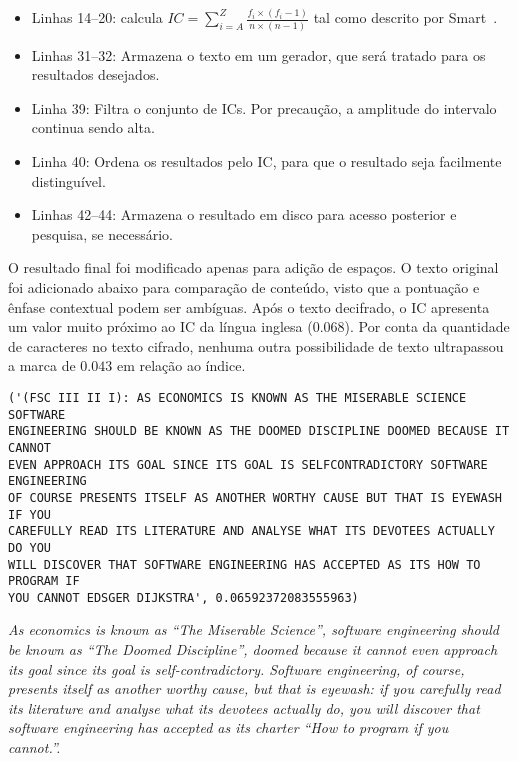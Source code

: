 \documentclass{../sftex/sftex}
\begin{document}
\begin{itemize}

    \item Linhas 14--20: calcula
        $IC = \sum_{i=A}^Z \frac{f_i \times (f_i - 1)}{n \times (n - 1)}$ tal
        como descrito por Smart~\cite[p. 73]{Smart:2004:CI:1206247}.

    \item Linhas 31--32: Armazena o texto em um gerador, que será tratado para
        os resultados desejados.

    \item Linha 39: Filtra o conjunto de ICs. Por precaução, a amplitude do
        intervalo continua sendo alta.

    \item Linha 40: Ordena os resultados pelo IC, para que o resultado seja
        facilmente distinguível.

    \item Linhas 42--44: Armazena o resultado em disco para acesso posterior e
        pesquisa, se necessário.

\end{itemize}

O resultado final foi modificado apenas para adição de espaços. O texto
original foi adicionado abaixo para comparação de conteúdo, visto que a
pontuação e ênfase contextual podem ser ambíguas. Após o texto decifrado, o IC
apresenta um valor muito próximo ao IC da língua inglesa ($0.068$). Por conta
da quantidade de caracteres no texto cifrado, nenhuma outra possibilidade de
texto ultrapassou a marca de $0.043$ em relação ao índice.

\begin{verbatim}
('(FSC III II I): AS ECONOMICS IS KNOWN AS THE MISERABLE SCIENCE SOFTWARE
ENGINEERING SHOULD BE KNOWN AS THE DOOMED DISCIPLINE DOOMED BECAUSE IT CANNOT
EVEN APPROACH ITS GOAL SINCE ITS GOAL IS SELFCONTRADICTORY SOFTWARE ENGINEERING
OF COURSE PRESENTS ITSELF AS ANOTHER WORTHY CAUSE BUT THAT IS EYEWASH IF YOU
CAREFULLY READ ITS LITERATURE AND ANALYSE WHAT ITS DEVOTEES ACTUALLY DO YOU
WILL DISCOVER THAT SOFTWARE ENGINEERING HAS ACCEPTED AS ITS HOW TO PROGRAM IF
YOU CANNOT EDSGER DIJKSTRA', 0.06592372083555963)
\end{verbatim}

\textit{As economics is known as ``The Miserable Science'', software engineering
should be known as ``The Doomed Discipline'', doomed because it cannot even
approach its goal since its goal is self-contradictory. Software engineering,
of course, presents itself as another worthy cause, but that is eyewash: if
you carefully read its literature and analyse what its devotees actually do,
you will discover that software engineering has accepted as its charter ``How
to program if you cannot.''.}~\cite{dijkstra1989cruelty} \vspace{2mm}
\end{document}
